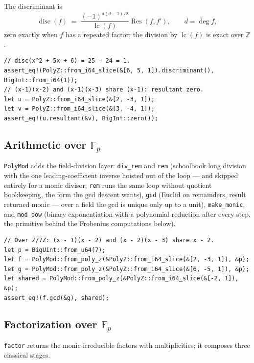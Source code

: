 \documentclass[11pt]{article}
\newcommand{\code}[1]{\texttt{#1}}
\newcommand{\Z}{\mathbb{Z}}
\newcommand{\F}{\mathbb{F}}
\newcommand{\lc}{\operatorname{lc}}
\newcommand{\Res}{\operatorname{Res}}
\newcommand{\disc}{\operatorname{disc}}
\begin{document}
The discriminant is
\begin{equation}
\disc(f) \;=\; \frac{(-1)^{d(d-1)/2}}{\lc(f)} \Res(f, f'),
\qquad d = \deg f,
\end{equation}
zero exactly when $f$ has a repeated factor; the division by $\lc(f)$ is
exact over $\Z$.

\begin{lstlisting}
// disc(x^2 + 5x + 6) = 25 - 24 = 1.
assert_eq!(PolyZ::from_i64_slice(&[6, 5, 1]).discriminant(), BigInt::from_i64(1));
// (x-1)(x-2) and (x-1)(x-3) share (x-1): resultant zero.
let u = PolyZ::from_i64_slice(&[2, -3, 1]);
let v = PolyZ::from_i64_slice(&[3, -4, 1]);
assert_eq!(u.resultant(&v), BigInt::zero());
\end{lstlisting}

\subsection{Arithmetic over $\F_p$}

\code{PolyMod} adds the field-division layer: \code{div\_rem} and
\code{rem} (schoolbook long division with the one leading-coefficient
inverse hoisted out of the loop --- and skipped entirely for a monic
divisor; \code{rem} runs the same loop without quotient bookkeeping, the
form the gcd descent wants), \code{gcd} (Euclid on remainders, result
returned monic --- over a field the gcd is unique only up to a unit),
\code{make\_monic}, and \code{mod\_pow} (binary exponentiation with a
polynomial reduction after every step, the primitive behind the Frobenius
computations below).

\begin{lstlisting}
// Over Z/7Z: (x - 1)(x - 2) and (x - 2)(x - 3) share x - 2.
let p = BigUint::from_u64(7);
let f = PolyMod::from_poly_z(&PolyZ::from_i64_slice(&[2, -3, 1]), &p);
let g = PolyMod::from_poly_z(&PolyZ::from_i64_slice(&[6, -5, 1]), &p);
let shared = PolyMod::from_poly_z(&PolyZ::from_i64_slice(&[-2, 1]), &p);
assert_eq!(f.gcd(&g), shared);
\end{lstlisting}

\subsection{Factorization over $\F_p$}
\label{sec:factor}

\code{factor} returns the monic irreducible factors with multiplicities;
it composes three classical stages.
\end{document}

